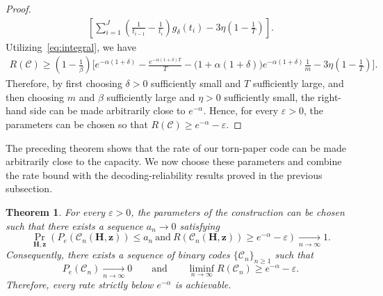 \documentclass[journal,letterpaper,onecolumn,11pt]{IEEEtran}
\newcommand{\cC}{\mathcal{C}}
\newcommand{\boldz}{\mathbf{z}}
\newcommand{\boldH}{\mathbf{H}}
\newtheorem{theorem}{Theorem}
\begin{document}
\begin{proof}
\[\begin{aligned}
\left[
\sum_{i=1}^{J}
\left(
\frac{1}{t_{i-1}}-\frac{1}{t_i}
\right)
g_\delta(t_i)-3\eta\left(1-\frac{1}{T}\right)
\right].
\end{aligned}
\]
Utilizing~\eqref{eq:integral}, we have
\[
\begin{aligned}
R(\cC)
\geq
\left(1-\frac{1}{\beta}\right)
\Bigg[
e^{-\alpha(1+\delta)}
-
\frac{e^{-\alpha(1+\delta)T}}{T}
-
\bigl(1+\alpha(1+\delta)\bigr)e^{-\alpha(1+\delta)}
\frac{1}{m}
-
3\eta\left(1-\frac{1}{T}\right)
\Bigg].
\end{aligned}
\]
Therefore, by first choosing \(\delta>0\) sufficiently small and \(T\)
sufficiently large, and then choosing \(m\) and \(\beta\) sufficiently
large and \(\eta>0\) sufficiently small, the right-hand side can be made
arbitrarily close to \(e^{-\alpha}\).
Hence, for every \(\varepsilon>0\), the parameters can be chosen so that $R(\cC)\geq e^{-\alpha}-\varepsilon$.
\end{proof}

The preceding theorem shows that the rate of our torn-paper code can be made arbitrarily close to the capacity. 
We now choose these parameters and combine the rate bound with the decoding-reliability results proved in the previous subsection.

\begin{theorem}\label{theorem:capacity-achieving-family}
For every \(\varepsilon>0\), the parameters of the construction can be
chosen such that there exists a sequence \(a_n\to0\)
satisfying
\[
\Pr_{\boldH,\boldz}\left(
P_e(\cC_n(\boldH,\boldz))\leq a_n
\ \text{and}\
R(\cC_n(\boldH,\boldz))\geq e^{-\alpha}-\varepsilon
\right)
\xrightarrow[n\to\infty]{}1.
\]
Consequently, there exists a sequence of binary codes
\(\{\cC_n\}_{n\geq1}\) such that
\[
P_e(\cC_n)\xrightarrow[n\to\infty]{}0
\qquad\text{and}\qquad
\liminf_{n\to\infty}R(\cC_n)
\geq e^{-\alpha}-\varepsilon.
\]
Therefore, every rate strictly below \(e^{-\alpha}\) is achievable.
\end{theorem}
\end{document}
